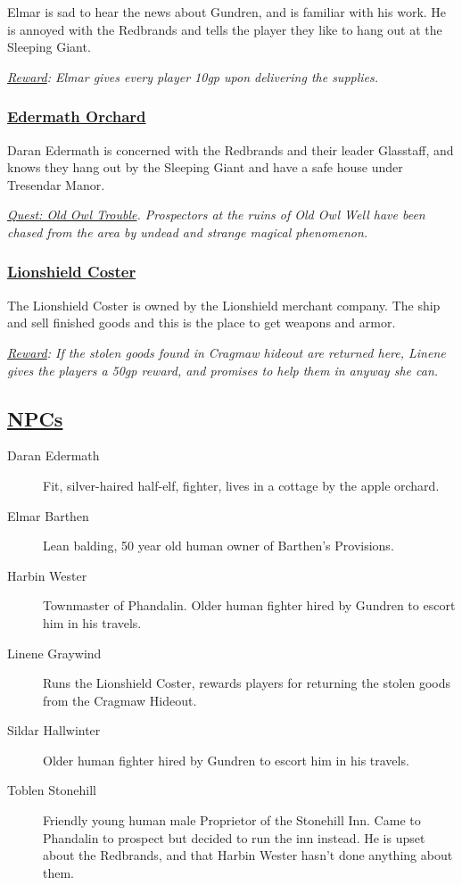 Elmar is sad to hear the news about Gundren, and is familiar with his work. He is annoyed with the Redbrands and tells the player they like to hang out at the Sleeping Giant.

\emph{\underline{Reward}: Elmar gives every player 10gp upon delivering the supplies.}

\subsubsection*{\underline{Edermath Orchard}}
Daran Edermath is concerned with the Redbrands and their leader Glasstaff, and knows they hang out by the Sleeping Giant and have a safe house under Tresendar Manor.

\emph{\underline{Quest: Old Owl Trouble}. Prospectors at the ruins of Old Owl Well have been chased from the area by undead and strange magical phenomenon. }


\subsubsection*{\underline{Lionshield Coster}}
The Lionshield Coster is owned by the Lionshield merchant company. The ship and sell finished goods and this is the place to get weapons and armor. 

\emph{\underline{Reward}: If the stolen goods found in Cragmaw hideout are returned here, Linene gives the players a 50gp reward, and promises to help them in anyway she can.}

\subsection*{\underline{NPCs}}
\begin{description}
	\item[Daran Edermath] Fit, silver-haired half-elf, fighter, lives in a cottage by the apple orchard.
	\item[Elmar Barthen] Lean balding, 50 year old human owner of Barthen's Provisions.
	\item[Harbin Wester] Townmaster of Phandalin. Older human fighter hired by Gundren to escort him in his travels.
	\item[Linene Graywind] Runs the Lionshield Coster, rewards players for returning the stolen goods from the Cragmaw Hideout.
	\item[Sildar Hallwinter] Older human fighter hired by Gundren to escort him in his travels.
	\item[Toblen Stonehill] Friendly young human male Proprietor of the Stonehill Inn. Came to Phandalin to prospect but decided to run the inn instead. He is upset about the Redbrands, and that Harbin Wester hasn't done anything about them.
\end{description}
